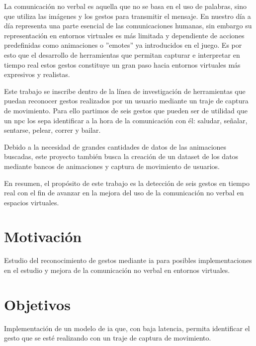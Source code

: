 La comunicación no verbal es aquella que no se basa en el uso de palabras, sino que utiliza las imágenes y los gestos para transmitir el mensaje.
En nuestro día a día representa una parte esencial de las comunicaciones humanas, sin embargo su representación en entornos virtuales es más limitada y dependiente de acciones predefinidas como animaciones o ''emotes'' ya introducidos en el juego.
Es por esto que el desarrollo de herramientas que permitan capturar e interpretar en tiempo real estos gestos constituye un gran paso hacia entornos virtuales más expresivos y realistas.

Este trabajo se inscribe dentro de la línea de investigación de herramientas que puedan reconocer gestos realizados por un usuario mediante un traje de captura de movimiento.
Para ello partimos de seis gestos que pueden ser de utilidad que un \gls{npc} los sepa identificar a la hora de la comunicación con él: saludar, señalar, sentarse, pelear, correr y bailar.

Debido a la necesidad de grandes cantidades de datos de las animaciones buscadas, este proyecto también busca la creación de un dataset de los datos mediante bancos de animaciones y captura de movimiento de usuarios.

En resumen, el propósito de este trabajo es la detección de seis gestos en tiempo real con el fin de avanzar en la mejora del uso de la comunicación no verbal en espacios virtuales.

\section{Motivación}
Estudio del reconocimiento de gestos mediante \gls{ia} para posibles implementaciones en el estudio y mejora de la comunicación no verbal en entornos virtuales.

\section{Objetivos}
Implementación de un modelo de \gls{ia} que, con baja latencia, permita identificar el gesto que se esté realizando con un traje de captura de movimiento.

